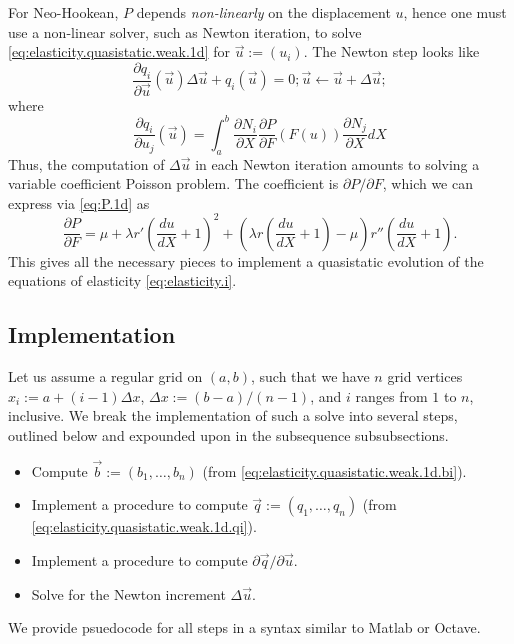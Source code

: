 For Neo-Hookean, $P$ depends \emph{non-linearly} on the displacement $u$, hence one must use a non-linear solver, such as Newton iteration, to solve \eqref{eq:elasticity.quasistatic.weak.1d} for $\vec{u} := \left( u_i \right)$. The Newton step looks like
\begin{subequations}
\begin{equation*}
\frac{\partial q_i}{\partial\vec{u}} \left( \vec{u} \right) \Delta \vec{u} + q_i \left( \vec{u} \right) = 0;
\end{equation*}
\begin{equation*}
\vec{u} \leftarrow \vec{u} + \Delta \vec{u};
\end{equation*}
\end{subequations}
where
\begin{equation*}
\frac{\partial q_i}{\partial u_j} \left( \vec{u} \right) = \int_a^b \frac{\partial N_i}{\partial X} \frac{\partial P}{\partial F} \left( F(u) \right) \frac{\partial N_j}{\partial X} dX
\end{equation*}
Thus, the computation of $\Delta \vec{u}$ in each Newton iteration amounts to solving a variable coefficient Poisson problem. The coefficient is $\partial P/\partial F$, which we can express via \eqref{eq:P.1d} as
\begin{equation*}
\frac{\partial P}{\partial F} = \mu + \lambda r' \left( \frac{du}{dX} + 1 \right)^2 + \left( \lambda r \left( \frac{du}{dX} + 1 \right) - \mu \right) r'' \left( \frac{du}{dX} + 1 \right).
\end{equation*}
This gives all the necessary pieces to implement a quasistatic evolution of the equations of elasticity \eqref{eq:elasticity.i}.

\subsection{Implementation}

Let us assume a regular grid on $(a,b)$, such that we have $n$ grid vertices $x_i := a + (i - 1) \Delta x$, $\Delta x := (b - a)/(n - 1)$, and $i$ ranges from $1$ to $n$, inclusive. We break the implementation of such a solve into several steps, outlined below and expounded upon in the subsequence subsubsections.
\begin{itemize}
\item Compute $\vec{b} := \left( b_1, \dotsc, b_n \right)$ (from \eqref{eq:elasticity.quasistatic.weak.1d.bi}).
\item Implement a procedure to compute $\vec{q} := \left( q_1, \dotsc, q_n \right)$ (from \eqref{eq:elasticity.quasistatic.weak.1d.qi}).
\item Implement a procedure to compute $\partial\vec{q}/\partial\vec{u}$.
\item Solve for the Newton increment $\Delta \vec{u}$.
\end{itemize}
We provide psuedocode for all steps in a syntax similar to Matlab or Octave.

